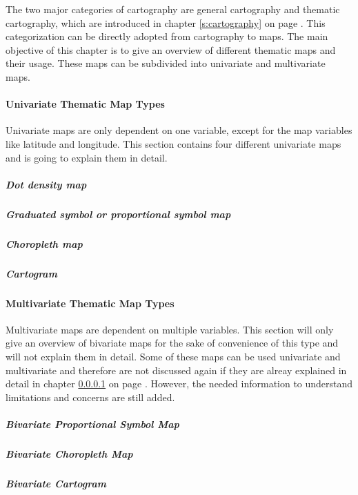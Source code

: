 The two major categories of cartography are general cartography and thematic cartography, which are introduced in chapter \ref{s:cartography} on page \pageref{s:cartography}. This categorization can be directly adopted from cartography to maps. The main objective of this chapter is to give an overview of different thematic maps and their usage. These maps can be subdivided into univariate and multivariate maps.

\paragraph{Univariate Thematic Map Types}
\label{s:univariate-maps}

Univariate maps are only dependent on one variable, except for the map variables like latitude and longitude. This section contains four different univariate maps and is going to explain them in detail.

\subparagraph{Dot density map}
\label{s:dot}


\subparagraph{Graduated symbol or proportional symbol map}


\subparagraph{Choropleth map}

\label{s:choropleth}

\subparagraph{Cartogram}


\paragraph{Multivariate Thematic Map Types}
Multivariate maps are dependent on multiple variables. This section will only give an overview of bivariate maps for the sake of convenience of this type and will not explain them in detail. Some of these maps can be used univariate and multivariate and therefore are not discussed again if they are alreay explained in detail in chapter \ref{s:univariate-maps} on page \pageref{s:univariate-maps}. However, the needed information to understand limitations and concerns are still added.

\subparagraph{Bivariate Proportional Symbol Map}


\subparagraph{Bivariate Choropleth Map}


\subparagraph{Bivariate Cartogram}
